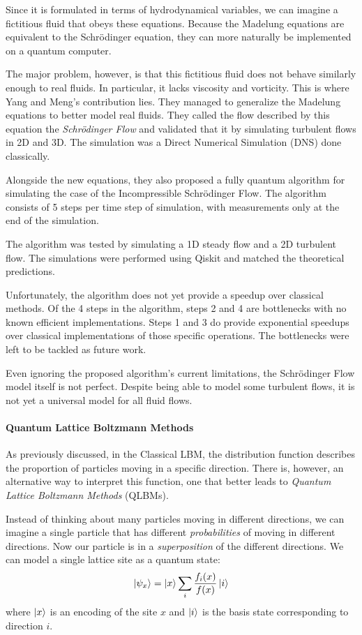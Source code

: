 Since it is formulated in terms of hydrodynamical variables, we can imagine a fictitious fluid that obeys these equations. Because the Madelung equations are equivalent to the Schrödinger equation, they can more naturally be implemented on a quantum computer.

The major problem, however, is that this fictitious fluid does not behave similarly enough to real fluids. In particular, it lacks viscosity and vorticity.
This is where Yang and Meng's contribution lies. They managed to generalize the Madelung equations to better model real fluids.
They called the flow described by this equation the \emph{Schrödinger Flow} and validated that it by simulating turbulent flows in 2D and 3D. The simulation was a Direct Numerical Simulation (DNS) done classically.

Alongside the new equations, they also proposed a fully quantum algorithm for simulating the case of the Incompressible Schrödinger Flow.
The algorithm consists of 5 steps per time step of simulation, with measurements only at the end of the simulation.

The algorithm was tested by simulating a 1D steady flow and a 2D turbulent flow.
The simulations were performed using Qiskit \cite{qiskit2024} and matched the theoretical predictions.

Unfortunately, the algorithm does not yet provide a speedup over classical methods. Of the 4 steps in the algorithm, steps 2 and 4 are bottlenecks with no known efficient implementations.
Steps 1 and 3 do provide exponential speedups over classical implementations of those specific operations.
The bottlenecks were left to be tackled as future work.

Even ignoring the proposed algorithm's current limitations, the Schrödinger Flow model itself is not perfect.
Despite being able to model some turbulent flows, it is not yet a universal model for all fluid flows.

\paragraph*{Quantum Lattice Boltzmann Methods}
As previously discussed, in the Classical LBM, the distribution function describes the proportion of particles moving in a specific direction.
There is, however, an alternative way to interpret this function, one that better leads to \emph{Quantum Lattice Boltzmann Methods} (QLBMs).

Instead of thinking about many particles moving in different directions, we can imagine a single particle that has different \emph{probabilities} of moving in different directions.
Now our particle is in a \emph{superposition} of the different directions. We can model a single lattice site as a quantum state:
\begin{displaymath}
    \label{eq:qlbm}
    \ket{\psi_x} = \ket{x}\sum_{i} \frac{f_{i}(x)}{f(x)} \ket{i}
\end{displaymath}
where $\ket{x}$ is an encoding of the site $x$ and $\ket{i}$ is the basis state corresponding to direction $i$.

